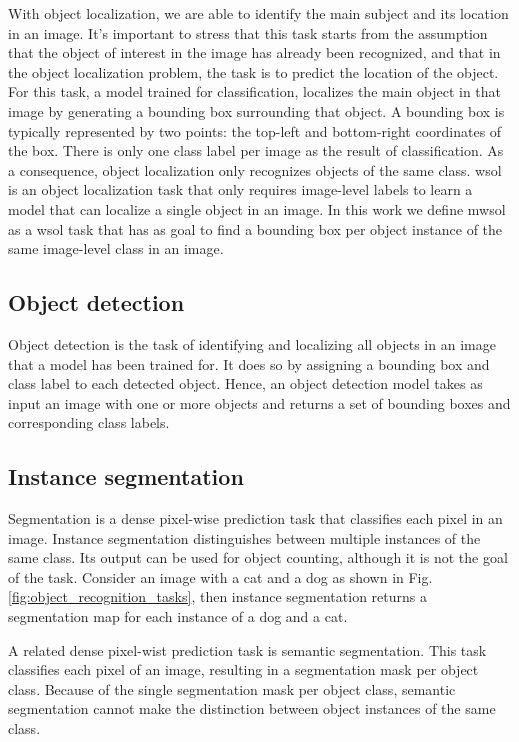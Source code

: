 With object localization, we are able to identify the main subject and its location in an image. It's important to stress that this task starts from the assumption that the object of interest in the image has already been recognized, and that in the object localization problem, the task is to predict the location of the object. For this task, a model trained for classification, localizes the main object in that image by generating a bounding box surrounding that object. A bounding box is typically represented by two points: the top-left and bottom-right coordinates of the box. There is only one class label per image as the result of classification. As a consequence, object localization only recognizes objects of the same class. \acrfull{wsol} \cite{zhou2016cvpr} is an object localization task that only requires image-level labels to learn a model that can localize a single object in an image. In this work we define \acrfull{mwsol} as a \acrshort{wsol} task that has as goal to find a bounding box per object instance of the same image-level class in an image.

\subsection{Object detection}
Object detection is the task of identifying and localizing all objects in an image that a model has been trained for. It does so by assigning a bounding box and class label to each detected object. Hence, an object detection model takes as input an image with one or more objects and returns a set of bounding boxes and corresponding class labels.

\subsection{Instance segmentation}
Segmentation is a dense pixel-wise prediction task that classifies each pixel in an image. Instance segmentation distinguishes between multiple instances of the same class. Its output can be used for object counting, although it is not the goal of the task.
Consider an image with a cat and a dog as shown in Fig. \ref{fig:object_recognition_tasks}, then instance segmentation returns a segmentation map for each instance of a dog and a cat.

A related dense pixel-wist prediction task is semantic segmentation. This task classifies each pixel of an image, resulting in a segmentation mask per object class. Because of the single segmentation mask per object class, semantic segmentation cannot make the distinction between object instances of the same class.

